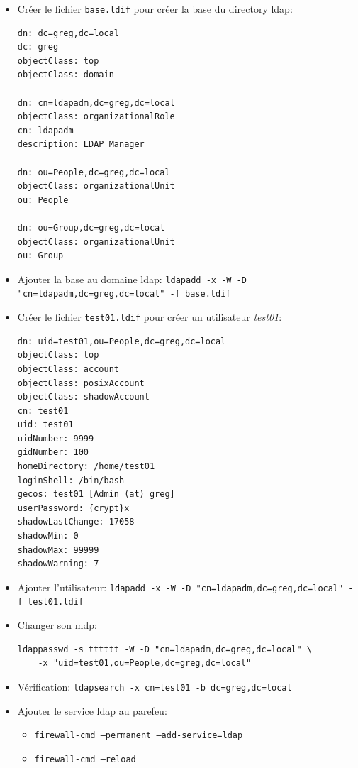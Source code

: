 \documentclass[a4paper]{article}
\begin{document}
\begin{itemize}
\item Créer le fichier \texttt{base.ldif} pour créer la base du directory ldap:
\begin{example} \begin{verbatim}
dn: dc=greg,dc=local
dc: greg
objectClass: top
objectClass: domain

dn: cn=ldapadm,dc=greg,dc=local
objectClass: organizationalRole
cn: ldapadm
description: LDAP Manager

dn: ou=People,dc=greg,dc=local
objectClass: organizationalUnit
ou: People

dn: ou=Group,dc=greg,dc=local
objectClass: organizationalUnit
ou: Group
\end{verbatim} \end{example}


\item Ajouter la base au domaine ldap: \texttt{ldapadd -x -W -D "cn=ldapadm,dc=greg,dc=local" -f base.ldif}


\item Créer le fichier \texttt{test01.ldif} pour créer un utilisateur \textit{test01}:
\begin{example} \begin{verbatim}
dn: uid=test01,ou=People,dc=greg,dc=local
objectClass: top
objectClass: account
objectClass: posixAccount
objectClass: shadowAccount
cn: test01
uid: test01
uidNumber: 9999
gidNumber: 100
homeDirectory: /home/test01
loginShell: /bin/bash
gecos: test01 [Admin (at) greg]
userPassword: {crypt}x
shadowLastChange: 17058
shadowMin: 0
shadowMax: 99999
shadowWarning: 7
\end{verbatim} \end{example}


\item Ajouter l'utilisateur: \texttt{ldapadd -x -W -D "cn=ldapadm,dc=greg,dc=local" -f test01.ldif}


\item Changer son mdp:
\begin{example} \begin{verbatim}
ldappasswd -s tttttt -W -D "cn=ldapadm,dc=greg,dc=local" \
    -x "uid=test01,ou=People,dc=greg,dc=local"
\end{verbatim} \end{example}


\item Vérification: \texttt{ldapsearch -x cn=test01 -b dc=greg,dc=local}


\item Ajouter le service ldap au parefeu:
\begin{example} \begin{itemize}
    \item \texttt{firewall-cmd --permanent --add-service=ldap}
    \item \texttt{firewall-cmd --reload}
\end{itemize} \end{example}



\end{itemize}
\end{document}
